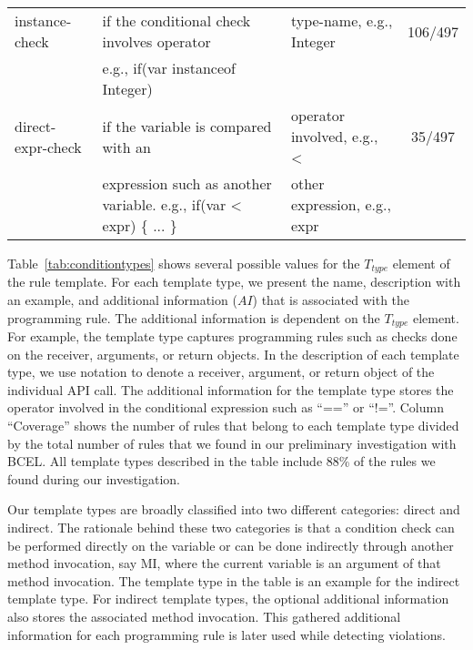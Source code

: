 \begin{table*}[t]
\begin{SmallOut}
\begin{CodeOut}
\begin{center}
\begin {tabular} {|l|l|l|c|}
\hline instance-check&if the conditional check involves \CodeIn{instanceof} operator&type-name, e.g., Integer&106/497\\
			 &e.g., if(var instanceof Integer)&&\\
\hline direct-expr-check&if the variable is compared with an &operator involved, e.g., <&35/497\\
			 &expression such as another variable. e.g., if(var < expr) \{ ... \}&other expression, e.g., expr&\\		 			 			 
\hline
\end{tabular}
\end{center}
\end{CodeOut}
\end{SmallOut}
\vspace*{-4ex}
\end{table*}

Table~\ref{tab:conditiontypes} shows several possible values for the $T_{type}$ element
of the rule template. For each template type, we present the name, description with an example, 
and additional information ($AI$) that is associated with the programming rule. 
The additional information is dependent on the $T_{type}$ element.
For example, the template type  
captures programming rules such as  checks done on the receiver, arguments, or return objects. 
In the description of each template type, we use notation  
to denote a receiver, argument, or return object of the individual API call. The additional
information for the template type  stores the operator involved in the 
conditional expression such as ``=='' or ``!=''. Column ``Coverage'' shows the number
of rules that belong to each template type divided by the total number of 
rules that we found in our preliminary investigation with BCEL. All template
types described in the table include 88\% of the rules we found during our investigation.

Our template types are broadly classified into two different
categories: direct and indirect. The rationale behind these two categories 
is that a condition check can be performed directly on the variable or
can be done indirectly through another method invocation, say MI, where the current
variable is an argument of that method invocation. The template
type  in the table is an example for the indirect template type. 
For indirect template types, the optional additional information 
also stores the associated method invocation. This gathered additional information 
for each programming rule is later used while detecting violations.

